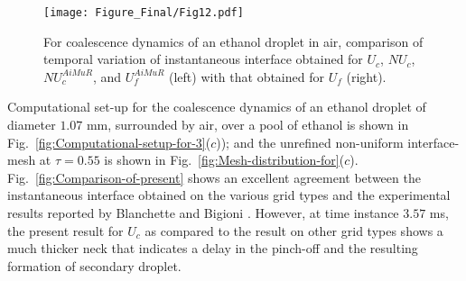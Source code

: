 \documentclass[preprint,12pt]{elsarticle}
\begin{document}
\begin{figure}

\begin{centering}
\texttt{[image: Figure\_Final/Fig12.pdf]}
\par\end{centering}








\protect\caption{\label{fig:Comparison-of-interface}
For coalescence dynamics of an ethanol droplet in air, comparison of temporal variation of instantaneous interface obtained for $U_{c}$, $NU_{c}$, $NU_{c}^{AiMuR}$, and $U_{f}^{AiMuR}$ (left) with that obtained for $U_{f}$ (right).}
\end{figure}

Computational set-up for the coalescence dynamics of an ethanol droplet of diameter $1.07$ mm, surrounded by air, over a pool of ethanol is shown in Fig.~\ref{fig:Computational-setup-for-3}($c$)); and the unrefined non-uniform interface-mesh at $\tau = 0.55$ is shown in Fig.~\ref{fig:Mesh-distribution-for}($c$). Fig.~\ref{fig:Comparison-of-present} shows an excellent agreement between the instantaneous interface obtained on the various grid types and the experimental results reported by Blanchette and Bigioni \cite{blanchette2006}. However, at time instance $3.57$ ms, the present result for $U_{c}$ as compared to the result on other grid types shows a much thicker neck that indicates a delay in the pinch-off and the resulting formation of secondary droplet.
\end{document}
